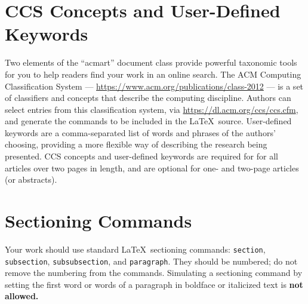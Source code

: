 \documentclass[sigplan,screen]{acmart}
\begin{document}
\section{CCS Concepts and User-Defined Keywords}
Two elements of the ``acmart'' document class provide powerful
taxonomic tools for you to help readers find your work in an online
search.
The ACM Computing Classification System ---
\url{https://www.acm.org/publications/class-2012} --- is a set of
classifiers and concepts that describe the computing
discipline. Authors can select entries from this classification
system, via \url{https://dl.acm.org/ccs/ccs.cfm}, and generate the
commands to be included in the \LaTeX\ source.
User-defined keywords are a comma-separated list of words and phrases
of the authors' choosing, providing a more flexible way of describing
the research being presented.
CCS concepts and user-defined keywords are required for for all
articles over two pages in length, and are optional for one- and
two-page articles (or abstracts).
\section{Sectioning Commands}
Your work should use standard \LaTeX\ sectioning commands:
\verb|section|, \verb|subsection|, \verb|subsubsection|, and
\verb|paragraph|. They should be numbered; do not remove the numbering
from the commands.
Simulating a sectioning command by setting the first word or words of
a paragraph in boldface or italicized text is {\bfseries not allowed.}
\end{document}
